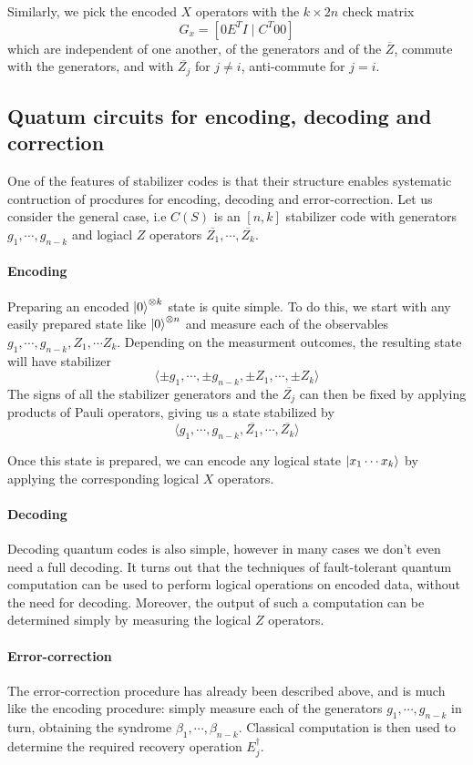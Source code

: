 \documentclass[11pt,a4paper]{article}
\theoremstyle{definition}
\theoremstyle{plain}
\theoremstyle{remark}
\begin{document}
Similarly, we pick the encoded $X$ operators with the $k \times 2n$ check matrix 
$$G_x = \left[0 E^T I \mid C^T 0 0\right]$$
which are independent of one another, of the generators and of the $\overline{Z}$, commute with the generators, and with $\overline{Z_j}$ for $j \neq i$, anti-commute for 
$j = i$. 

\subsection{Quatum circuits for encoding, decoding and correction}
One of the features of stabilizer codes is that their structure enables systematic contruction 
of procdures for encoding, decoding and error-correction. Let us consider 
the general case, i.e $C(S)$ is an $[n,k]$ stabilizer code with generators $g_1, \cdots, g_{n-k}$ and 
logiacl $Z$ operators $\overline{Z_1}, \cdots, \overline{Z_k}$. 

\paragraph{Encoding} Preparing an encoded $\ket{0}^{\otimes k}$ state is quite simple. 
To do this, we start with any easily prepared state like $\ket{0}^{\otimes n}$ and measure each of the 
observables $g_1, \cdots, g_{n-k}, Z_1, \cdots Z_k$. Depending on the measurment outcomes, the resulting state will 
have stabilizer 
$$\langle \pm g_1, \cdots, \pm g_{n-k}, \pm Z_1, \cdots, \pm Z_k\rangle$$ 
The signs of all the stabilizer generators and the $\overline{Z_j}$ can then be fixed by applying products of 
Pauli operators, giving us a state stabilized by 
$$\langle g_1, \cdots, g_{n-k}, \overline{Z_1}, \cdots, \overline{Z_k} \rangle$$

Once this state is prepared, we can encode any logical state $\ket{x_1 \cdots x_k}$ by applying the corresponding 
logical $X$ operators. 

\paragraph{Decoding} Decoding quantum codes is also simple, however in many cases we don't even need a full decoding. 
It turns out that the techniques of fault-tolerant quantum computation can be used to perform logical operations on 
encoded data, without the need for decoding. 
Moreover, the output of such a computation can be determined simply by measuring the logical $Z$ operators. 

\paragraph{Error-correction} The error-correction procedure has already been described above, 
and is much like the encoding procedure: simply measure each of the generators $g_1, \cdots, g_{n-k}$ 
in turn, obtaining the syndrome $\beta_1, \cdots, \beta_{n-k}$. Classical computation is then used to 
determine the required recovery operation $E_j^\dagger$. 
\end{document}
